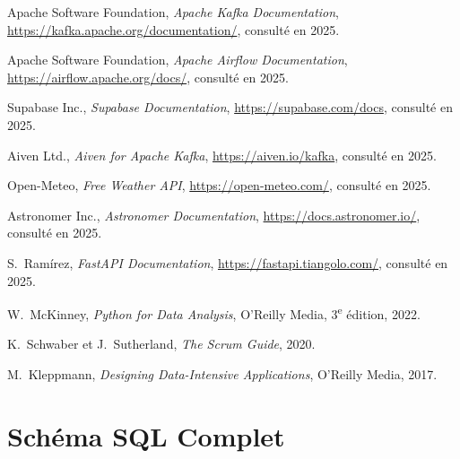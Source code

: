 \documentclass[a4paper,12pt,oneside]{report}
\begin{document}
\begin{enumerate}[label={[\arabic*]}]
  \item Apache Software Foundation, \textit{Apache Kafka Documentation}, \url{https://kafka.apache.org/documentation/}, consulté en 2025.
  \item Apache Software Foundation, \textit{Apache Airflow Documentation}, \url{https://airflow.apache.org/docs/}, consulté en 2025.
  \item Supabase Inc., \textit{Supabase Documentation}, \url{https://supabase.com/docs}, consulté en 2025.
  \item Aiven Ltd., \textit{Aiven for Apache Kafka}, \url{https://aiven.io/kafka}, consulté en 2025.
  \item Open-Meteo, \textit{Free Weather API}, \url{https://open-meteo.com/}, consulté en 2025.
  \item Astronomer Inc., \textit{Astronomer Documentation}, \url{https://docs.astronomer.io/}, consulté en 2025.
  \item S.~Ramírez, \textit{FastAPI Documentation}, \url{https://fastapi.tiangolo.com/}, consulté en 2025.
  \item W.~McKinney, \textit{Python for Data Analysis}, O'Reilly Media, 3\textsuperscript{e} édition, 2022.
  \item K.~Schwaber et J.~Sutherland, \textit{The Scrum Guide}, 2020.
  \item M.~Kleppmann, \textit{Designing Data-Intensive Applications}, O'Reilly Media, 2017.
\end{enumerate}

\appendix
\chapter{Schéma SQL Complet}
\label{app:sql}
\end{document}
